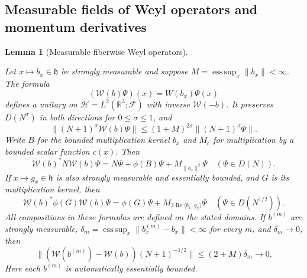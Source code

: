 \documentclass[11pt,a4paper]{article}
\newtheorem{lemma}[theorem]{Lemma}
\theoremstyle{definition}
\theoremstyle{remark}
\newcommand{\proofid}[1]{\par\smallskip{\normalfont\scriptsize\color{inkblue}Stable ID: \nolinkurl{#1}}\par\smallskip}
\begin{document}
\subsection{Measurable fields of Weyl operators and momentum derivatives}

\begin{lemma}[Measurable fiberwise Weyl operators]\label{fock:fiber-weyl}
\proofid{fock:fiber-weyl}
\par{}\par\smallskip

Let $x\mapsto b_x\in\mathfrak h$ be strongly measurable and suppose
$M=\operatorname*{ess\,sup}_x\|b_x\|<\infty$. The formula
\[
 (\mathcal W(b)\Psi)(x)=W(b_x)\Psi(x)
\]
defines a unitary on $\mathcal H=L^2(\mathbb R^3;\mathcal F)$ with
inverse $\mathcal W(-b)$. It preserves $D(N^\sigma)$ in both
 directions for $0\leq\sigma\leq1$, and
\[
 \|(N+1)^\sigma\mathcal W(b)\Psi\|
       \leq(1+M)^{2\sigma}\|(N+1)^\sigma\Psi\|.
\]
Write $B$ for the bounded multiplication kernel $b_x$ and $M_c$
for multiplication by a bounded scalar function $c(x)$. Then
\[
 \mathcal W(b)^*N\mathcal W(b)\Psi
       =N\Psi+\phi(B)\Psi+M_{\|b_x\|^2}\Psi
       \quad(\Psi\in D(N)).
\]
If $x\mapsto g_x\in\mathfrak h$ is also strongly measurable and
essentially bounded, and $G$ is its multiplication kernel, then
\[
 \mathcal W(b)^*\phi(G)\mathcal W(b)\Psi
   =\phi(G)\Psi+M_{2\operatorname{Re}\langle b_x,g_x\rangle}\Psi
       \quad(\Psi\in D(N^{1/2})).
\]
All compositions in these formulas are defined on the stated domains.
If $b^{(m)}$ are strongly measurable,
$\delta_m=\operatorname*{ess\,sup}_x\|b^{(m)}_x-b_x\|<\infty$
for every $m$, and $\delta_m\to0$, then
\[
 \|(\mathcal W(b^{(m)})-\mathcal W(b))(N+1)^{-1/2}\|
          \leq(2+M)\delta_m\longrightarrow0.
\]
Here each $b^{(m)}$ is automatically essentially bounded.
\end{lemma}
\end{document}
